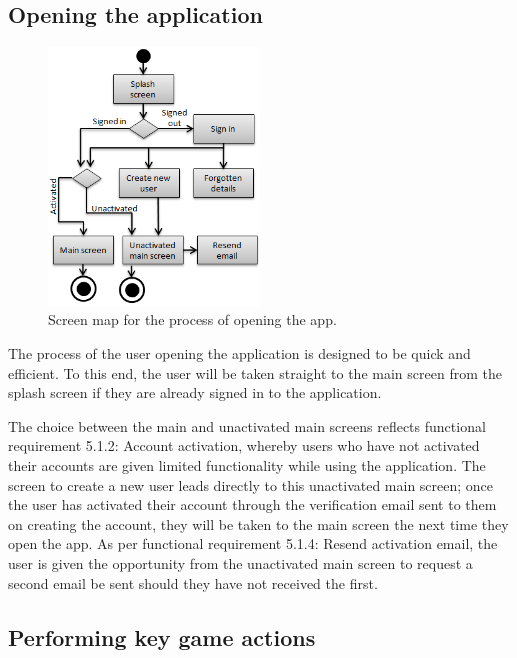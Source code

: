 \subsection{Opening the application}

\begin{figure}
	\vspace{-20pt}
	\begin{center}
	\includegraphics[width=0.5\textwidth]{images/opening_app}
	\caption{Screen map for the process of opening the app.}
	\end{center}
	\vspace{-20pt}
\end{figure}

The process of the user opening the application is designed to be quick and efficient. To this end, the user will be taken straight to the main screen from the splash screen if they are already signed in to the application.

The choice between the main and unactivated main screens reflects functional requirement 5.1.2: Account activation, whereby users who have not activated their accounts are given limited functionality while using the application. The screen to create a new user leads directly to this unactivated main screen; once the user has activated their account through the verification email sent to them on creating the account, they will be taken to the main screen the next time they open the app. As per functional requirement 5.1.4: Resend activation email, the user is given the opportunity from the unactivated main screen to request a second email be sent should they have not received the first.

\subsection{Performing key game actions}

